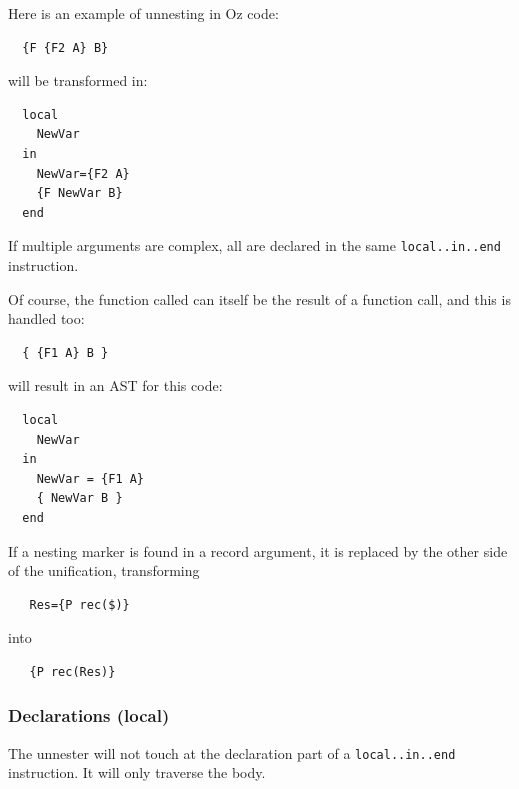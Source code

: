 \documentclass[a4paper]{memoir}
\begin{document}
Here is an example of unnesting in Oz code:
\begin{lstlisting}
  {F {F2 A} B}
\end{lstlisting}
will be transformed in:
\begin{lstlisting}
  local
    NewVar
  in
    NewVar={F2 A}
    {F NewVar B}
  end
\end{lstlisting}

If multiple arguments are complex, all are declared in the same
\lstinline!local..in..end! instruction.

Of course, the function called can itself be the result of a function call, and this is handled too:
\begin{lstlisting}
  { {F1 A} B }
\end{lstlisting}
will result in an AST for this code:
\begin{lstlisting}
  local
    NewVar
  in
    NewVar = {F1 A}
    { NewVar B }
  end
\end{lstlisting}

If a nesting marker is found in a record argument, it is replaced by the other
side of the unification, transforming
\begin{lstlisting}
   Res={P rec($)}
\end{lstlisting}
into
\begin{lstlisting}
   {P rec(Res)}
\end{lstlisting}

\subsubsection{Declarations (local)}
The unnester will not touch at the declaration part of a
\lstinline!local..in..end! instruction. It will only traverse the body.
\end{document}
